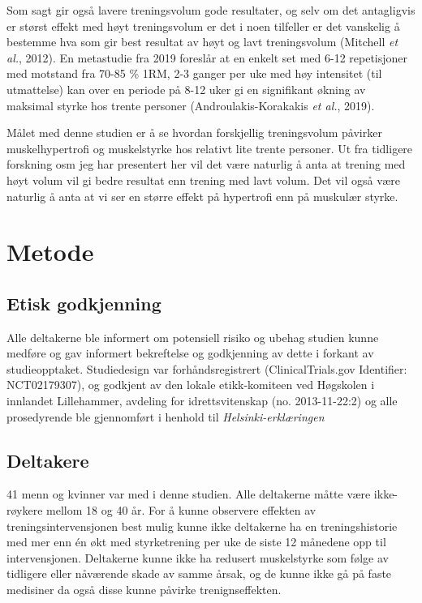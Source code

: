\documentclass[
  letterpaper,
  DIV=11,
  numbers=noendperiod]{scrreprt}
\begin{document}
Som sagt gir også lavere treningsvolum gode resultater, og selv om det
antagligvis er størst effekt med høyt treningsvolum er det i noen
tilfeller er det vanskelig å bestemme hva som gir best resultat av høyt
og lavt treningsvolum (Mitchell \emph{et al.}, 2012). En metastudie fra
2019 foreslår at en enkelt set med 6-12 repetisjoner med motstand fra
70-85 \% 1RM, 2-3 ganger per uke med høy intensitet (til utmattelse) kan
over en periode på 8-12 uker gi en signifikant økning av maksimal styrke
hos trente personer (Androulakis-Korakakis \emph{et al.}, 2019).

Målet med denne studien er å se hvordan forskjellig treningsvolum
påvirker muskelhypertrofi og muskelstyrke hos relativt lite trente
personer. Ut fra tidligere forskning osm jeg har presentert her vil det
være naturlig å anta at trening med høyt volum vil gi bedre resultat enn
trening med lavt volum. Det vil også være naturlig å anta at vi ser en
større effekt på hypertrofi enn på muskulær styrke.

\section{Metode}\label{metode-4}

\subsection{Etisk godkjenning}\label{etisk-godkjenning}

Alle deltakerne ble informert om potensiell risiko og ubehag studien
kunne medføre og gav informert bekreftelse og godkjenning av dette i
forkant av studieopptaket. Studiedesign var forhåndsregistrert
(ClinicalTrials.gov Identifier: NCT02179307), og godkjent av den lokale
etikk-komiteen ved Høgskolen i innlandet Lillehammer, avdeling for
idrettsvitenskap (no. 2013-11-22:2) og alle prosedyrende ble gjennomført
i henhold til \emph{Helsinki-erklæringen}

\subsection{Deltakere}\label{deltakere}

41 menn og kvinner var med i denne studien. Alle deltakerne måtte være
ikke-røykere mellom 18 og 40 år. For å kunne observere effekten av
treningsintervensjonen best mulig kunne ikke deltakerne ha en
treningshistorie med mer enn én økt med styrketrening per uke de siste
12 månedene opp til intervensjonen. Deltakerne kunne ikke ha redusert
muskelstyrke som følge av tidligere eller nåværende skade av samme
årsak, og de kunne ikke gå på faste medisiner da også disse kunne
påvirke trenignseffekten.
\end{document}
